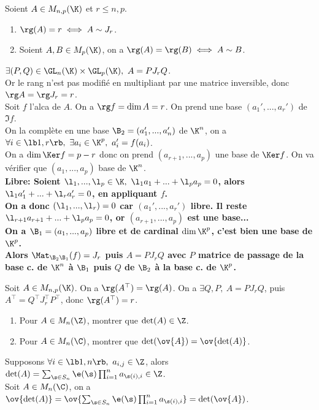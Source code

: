 \documentclass[11pt]{article}
\begin{document}
\vspace*{-0.7cm}

\begin{thm}{}{}
    Soient $A\in M_{n,p}(\K)$ et $r\leq n,p$.
    \begin{enumerate}
        \item $\rg(A)=r\iff A\sim J_r$.
        \item Soient $A,B\in M_p(\K)$, on a $\rg(A)=\rg(B)\iff A \sim B$.
    \end{enumerate}
    \tcblower
    \boxed{\la} $\exists (P,Q) \in \GL_n(\K)\times\GL_p(\K), ~ A = PJ_rQ$.\\
    Or le rang n'est pas modifié en multipliant par une matrice inversible, donc $\rg A = \rg J_r = r$.\\
    \boxed{\ra} Soit $f$ l'alca de $A$. On a $\rg f = \dim A = r$. On prend une base $(a_1',...,a_r')$ de $\Im f$.\\
    On la complète en une base $\B_2=(a_1', ..., a_n')$ de $\K^n$, on a $\forall i \in \lb 1, r \rb, ~ \exists a_i \in \K^p, ~ a_i'=f(a_i)$.\\
    On a $\dim\Ker f = p - r$ donc on prend $(a_{r+1},...,a_p)$ une base de $\Ker f$. On va vérifier que $(a_1,...,a_p)$ base de $\K^n$.\\
    \bf{Libre:} Soient $\l_1,...,\l_p\in\K, ~ \l_1a_1+...+\l_pa_p=0$, alors $\l_1a_1'+...+\l_ra_r'=0$, en appliquant $f$.\\
    On a donc $(\l_1,...,\l_r)=0$ car $(a_1',...,a_r')$ libre. Il reste $\l_{r+1}a_{r+1}+...+\l_pa_p=0$, or $(a_{r+1},...,a_p)$ est une base...\\
    On a $\B_1=(a_1,...,a_p)$ libre et de cardinal $\dim\K^p$, c'est bien une base de $\K^p$.\\
    Alors $\Mat_{\B_2\B_1}(f)=J_r$ puis $A=PJ_rQ$ avec $P$ matrice de passage de la base c. de $\K^n$ à $\B_1$ puis $Q$ de $\B_2$ à la base c. de $\K^p$.
\end{thm}

\vspace*{-0.7cm}

\begin{corr}{}{}
    Soit $A\in M_{n,p}(\K)$. On a $\rg(A^\top)=\rg(A)$.
    \tcblower
    On a $\exists Q,P, ~ A = PJ_rQ$, puis $A^\top = Q^\top J_r^\top P^\top$, donc $\rg(A^\top)=r$.
\end{corr}

\vspace*{-0.7cm}

\begin{ex}{}{}
    \begin{enumerate}
        \item Pour $A\in M_n(\Z)$, montrer que $\det(A)\in \Z$.
        \item Pour $A\in M_n(\C)$, montrer que $\det(\ov{A})=\ov{\det(A)}$.
    \end{enumerate}
    \tcblower
     Supposons $\forall i \in \lb1,n\rb, ~ a_{i,j}\in\Z$, alors $\det(A)=\sum_{\s\in S_n}\e(\s)\prod_{i=1}^n a_{\s(i),i}\in\Z$.\\
     Soit $A\in M_n(\C)$, on a $\ov{\det(A)}=\ov{\sum_{\s\in S_n}\e(\s)\prod_{i=1}^na_{\s(i),i}}=\det(\ov{A})$.
\end{ex}
\end{document}
